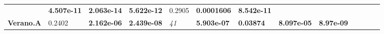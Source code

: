 \documentclass[]{book}
\theoremstyle{definition}
\theoremstyle{definition}
\theoremstyle{definition}
\theoremstyle{remark}
\begin{document}
\begin{longtable}[]{@{}lllllllllllll@{}}
\begin{minipage}[t]{0.05\columnwidth}
\end{minipage} & \begin{minipage}[t]{0.06\columnwidth}\raggedright
\textbf{4.507e-11}\strut
\end{minipage} & \begin{minipage}[t]{0.05\columnwidth}\raggedright
\textbf{2.063e-14}\strut
\end{minipage} & \begin{minipage}[t]{0.05\columnwidth}\raggedright
\textbf{5.622e-12}\strut
\end{minipage} & \begin{minipage}[t]{0.05\columnwidth}\raggedright
0.2905\strut
\end{minipage} & \begin{minipage}[t]{0.06\columnwidth}\raggedright
\textbf{0.0001606}\strut
\end{minipage} & \begin{minipage}[t]{0.05\columnwidth}\raggedright
\textbf{8.542e-11}\strut
\end{minipage}\tabularnewline
\begin{minipage}[t]{0.06\columnwidth}\raggedright
\textbf{Verano.A}\strut
\end{minipage} & \begin{minipage}[t]{0.05\columnwidth}\raggedright
0.2402\strut
\end{minipage} & \begin{minipage}[t]{0.05\columnwidth}\raggedright
\textbf{2.162e-06}\strut
\end{minipage} & \begin{minipage}[t]{0.06\columnwidth}\raggedright
\textbf{2.439e-08}\strut
\end{minipage} & \begin{minipage}[t]{0.05\columnwidth}\raggedright
\emph{41}\strut
\end{minipage} & \begin{minipage}[t]{0.05\columnwidth}\raggedright
\textbf{5.903e-07}\strut
\end{minipage} & \begin{minipage}[t]{0.05\columnwidth}\raggedright
\textbf{0.03874}\strut
\end{minipage} & \begin{minipage}[t]{0.06\columnwidth}\raggedright
\textbf{8.097e-05}\strut
\end{minipage} & \begin{minipage}[t]{0.05\columnwidth}\raggedright
\textbf{8.97e-09}\strut
\end{minipage} & \begin{minipage}[t]{0.05\columnwidth}\raggedright

\end{minipage}
\end{longtable}
\end{document}
